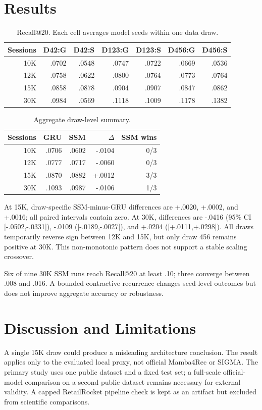 \documentclass[runningheads]{llncs}
\begin{document}
\section{Results}
\begin{table}[t]
\centering
\caption{Recall@20. Each cell averages model seeds within one data draw.}
\small
\begin{tabular}{rrrrrrr}
\toprule
Sessions & D42:G & D42:S & D123:G & D123:S & D456:G & D456:S\\
\midrule
10K & .0702 & .0548 & .0747 & .0722 & .0669 & .0536\\
12K & .0758 & .0622 & .0800 & .0764 & .0773 & .0764\\
15K & .0858 & .0878 & .0904 & .0907 & .0847 & .0862\\
30K & .0984 & .0569 & .1118 & .1009 & .1178 & .1382\\
\bottomrule
\end{tabular}
\end{table}

\begin{table}[t]
\centering
\caption{Aggregate draw-level summary.}
\begin{tabular}{rrrrr}
\toprule
Sessions & GRU & SSM & $\Delta$ & SSM wins\\
\midrule
10K & .0706 & .0602 & -.0104 & 0/3\\
12K & .0777 & .0717 & -.0060 & 0/3\\
15K & .0870 & .0882 & +.0012 & 3/3\\
30K & .1093 & .0987 & -.0106 & 1/3\\
\bottomrule
\end{tabular}
\end{table}

At 15K, draw-specific SSM-minus-GRU differences are +.0020, +.0002, and
+.0016; all paired intervals contain zero. At 30K, differences are -.0416
(95\% CI [-.0502,-.0331]), -.0109 ([-.0189,-.0027]), and +.0204
([+.0111,+.0298]). All draws temporarily reverse sign between 12K and 15K,
but only draw 456 remains positive at 30K. This non-monotonic pattern does not
support a stable scaling crossover.

Six of nine 30K SSM runs reach Recall@20 at least .10; three converge between
.008 and .016. A bounded contractive recurrence changes seed-level outcomes
but does not improve aggregate accuracy or robustness.

\section{Discussion and Limitations}
A single 15K draw could produce a misleading architecture conclusion. The
result applies only to the evaluated local proxy, not official Mamba4Rec or
SIGMA. The primary study uses one public dataset and a fixed test set; a
full-scale official-model comparison on a second public dataset remains
necessary for external validity. A capped RetailRocket pipeline check is kept
as an artifact but excluded from scientific comparisons.
\end{document}
